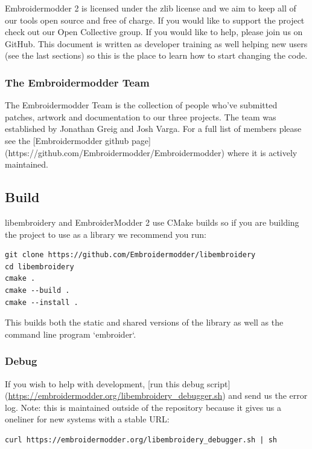 \documentclass[a4paper, 11pt]{report}
\begin{document}
Embroidermodder 2 is licensed under the zlib license and we aim to keep all of
our tools open source and free of charge. If you would like to support the
project check out our Open Collective group. If you would like to help, please
join us on GitHub. This document is written as developer training as well
helping new users (see the last sections) so this is the place to learn how
to start changing the code.

\subsubsection{The Embroidermodder Team}

The Embroidermodder Team is the collection of people who've submitted
patches, artwork and documentation to our three projects.
The team was established by Jonathan Greig and Josh Varga.
For a full list of members please see the
[Embroidermodder github page](https://github.com/Embroidermodder/Embroidermodder)
where it is actively maintained.

\subsection{Build}

libembroidery and EmbroiderModder 2 use CMake builds
so if you are building the project to use as a library we recommend
you run:
 
\begin{verbatim}
git clone https://github.com/Embroidermodder/libembroidery
cd libembroidery
cmake .
cmake --build .
cmake --install .
\end{verbatim}

This builds both the static and shared versions of the library as well
as the command line program `embroider`.

\subsubsection{Debug}

If you wish to help with development, [run this debug script](\url{https://embroidermodder.org/libembroidery_debugger.sh}) and send us the error log. Note: this is maintained outside of the repository because it gives us a oneliner for new systems with a stable URL:

\begin{verbatim}
curl https://embroidermodder.org/libembroidery_debugger.sh | sh
\end{verbatim}
\end{document}
